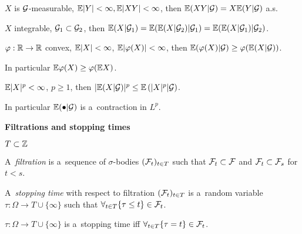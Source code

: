 	\begin{proposition}
		$X$ is $\mathcal{G}$-measurable, $\mathbb{E}|Y| < \infty, \mathbb{E}|XY| < \infty$,
		then $\mathbb{E}(XY | \mathcal{G}) = X \mathbb{E}(Y | \mathcal{G})$ a.s.
	\end{proposition}
	
	\begin{proposition}
		$X$ integrable, $\mathcal{G}_1 \subset \mathcal{G}_2$,
		then $\mathbb{E}(X | \mathcal{G}_1) = \mathbb{E}( \mathbb{E}(X | \mathcal{G}_2) | \mathcal{G}_1)
					= \mathbb{E}( \mathbb{E}(X | \mathcal{G}_1) | \mathcal{G}_2)$.
	\end{proposition}
	
	\begin{proposition}
		$\varphi:\mathbb{R} \to \mathbb{R}$ convex, $\mathbb{E} |X| < \infty$,
			$\mathbb{E} |\varphi(X)| < \infty$,
		then $\mathbb{E}(\varphi(X) | \mathcal{G}) \geq \varphi(\mathbb{E}(X | \mathcal{G}))$.
		
		In particular $\mathbb{E} \varphi(X) \geq \varphi(\mathbb{E} X)$.
	\end{proposition}
	
	\begin{corollary}
		$\mathbb{E} |X|^p < \infty$, $p \geq 1$,
		then $|\mathbb{E} ( X | \mathcal{G} )|^p \leq \mathbb{E}\left( |X|^p | \mathcal{G}\right)$.
		
		In particular $\mathbb{E}(\bullet | \mathcal{G})$ is a~contraction in $L^p$.
	\end{corollary}
	\vspace{0.5cm}
	
	{\bf Filtrations and stopping times}
	
		$T \subset {\mathbb{Z}}$
	\begin{definition}[filtration]
		A~\emph{filtration} is a~sequence of $\sigma$-bodies 
		$(\mathcal{F}_t)_{t \in T}$ such that $\mathcal{F}_t \subset \mathcal{F}$ and
		$\mathcal{F}_t \subset \mathcal{F}_s$ for $t < s$.
	\end{definition}
	
	\begin{definition}
		A~\emph{stopping time} with respect to filtration $(\mathcal{F}_t)_{t \in T}$ 
		is a~random variable $\tau: \Omega \to T \cup \{\infty\}$ such that
		$\displaystyle \forall_{t\in T} \{ \tau \leq t\} \in \mathcal{F}_t$.
	\end{definition}
	
	\begin{proposition}
		$\tau: \Omega \to T \cup \{\infty\}$ is a~stopping time
		iff $\forall_{t \in T} \{\tau = t\} \in \mathcal{F}_t$.
	\end{proposition}


 
 
